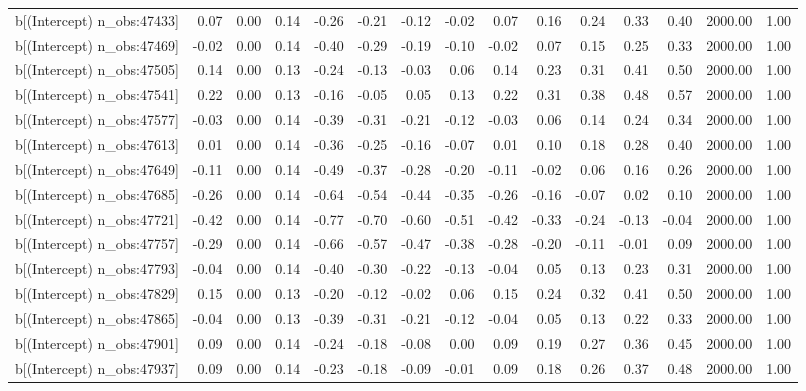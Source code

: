 \begin{table}[ht]
\begin{tabular}{rrrrrrrrrrrrrrr}
  b[(Intercept) n\_obs:47433] & 0.07 & 0.00 & 0.14 & -0.26 & -0.21 & -0.12 & -0.02 & 0.07 & 0.16 & 0.24 & 0.33 & 0.40 & 2000.00 & 1.00 \\ 
  b[(Intercept) n\_obs:47469] & -0.02 & 0.00 & 0.14 & -0.40 & -0.29 & -0.19 & -0.10 & -0.02 & 0.07 & 0.15 & 0.25 & 0.33 & 2000.00 & 1.00 \\ 
  b[(Intercept) n\_obs:47505] & 0.14 & 0.00 & 0.13 & -0.24 & -0.13 & -0.03 & 0.06 & 0.14 & 0.23 & 0.31 & 0.41 & 0.50 & 2000.00 & 1.00 \\ 
  b[(Intercept) n\_obs:47541] & 0.22 & 0.00 & 0.13 & -0.16 & -0.05 & 0.05 & 0.13 & 0.22 & 0.31 & 0.38 & 0.48 & 0.57 & 2000.00 & 1.00 \\ 
  b[(Intercept) n\_obs:47577] & -0.03 & 0.00 & 0.14 & -0.39 & -0.31 & -0.21 & -0.12 & -0.03 & 0.06 & 0.14 & 0.24 & 0.34 & 2000.00 & 1.00 \\ 
  b[(Intercept) n\_obs:47613] & 0.01 & 0.00 & 0.14 & -0.36 & -0.25 & -0.16 & -0.07 & 0.01 & 0.10 & 0.18 & 0.28 & 0.40 & 2000.00 & 1.00 \\ 
  b[(Intercept) n\_obs:47649] & -0.11 & 0.00 & 0.14 & -0.49 & -0.37 & -0.28 & -0.20 & -0.11 & -0.02 & 0.06 & 0.16 & 0.26 & 2000.00 & 1.00 \\ 
  b[(Intercept) n\_obs:47685] & -0.26 & 0.00 & 0.14 & -0.64 & -0.54 & -0.44 & -0.35 & -0.26 & -0.16 & -0.07 & 0.02 & 0.10 & 2000.00 & 1.00 \\ 
  b[(Intercept) n\_obs:47721] & -0.42 & 0.00 & 0.14 & -0.77 & -0.70 & -0.60 & -0.51 & -0.42 & -0.33 & -0.24 & -0.13 & -0.04 & 2000.00 & 1.00 \\ 
  b[(Intercept) n\_obs:47757] & -0.29 & 0.00 & 0.14 & -0.66 & -0.57 & -0.47 & -0.38 & -0.28 & -0.20 & -0.11 & -0.01 & 0.09 & 2000.00 & 1.00 \\ 
  b[(Intercept) n\_obs:47793] & -0.04 & 0.00 & 0.14 & -0.40 & -0.30 & -0.22 & -0.13 & -0.04 & 0.05 & 0.13 & 0.23 & 0.31 & 2000.00 & 1.00 \\ 
  b[(Intercept) n\_obs:47829] & 0.15 & 0.00 & 0.13 & -0.20 & -0.12 & -0.02 & 0.06 & 0.15 & 0.24 & 0.32 & 0.41 & 0.50 & 2000.00 & 1.00 \\ 
  b[(Intercept) n\_obs:47865] & -0.04 & 0.00 & 0.13 & -0.39 & -0.31 & -0.21 & -0.12 & -0.04 & 0.05 & 0.13 & 0.22 & 0.33 & 2000.00 & 1.00 \\ 
  b[(Intercept) n\_obs:47901] & 0.09 & 0.00 & 0.14 & -0.24 & -0.18 & -0.08 & 0.00 & 0.09 & 0.19 & 0.27 & 0.36 & 0.45 & 2000.00 & 1.00 \\ 
  b[(Intercept) n\_obs:47937] & 0.09 & 0.00 & 0.14 & -0.23 & -0.18 & -0.09 & -0.01 & 0.09 & 0.18 & 0.26 & 0.37 & 0.48 & 2000.00 & 1.00 \\ 

\end{tabular}
\end{table}
